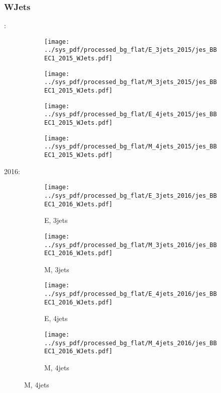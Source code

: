 \documentclass{beamer}
\begin{document}
\begin{frame}
\frametitle{WJets}
\fontsize{5}{1}:
\begin{figure}
\centering
\begin{subfigure}[b]{0.24\textwidth}
\texttt{[image: ../sys\_pdf/processed\_bg\_flat/E\_3jets\_2015/jes\_BBEC1\_2015\_WJets.pdf]}
\end{subfigure}
\begin{subfigure}[b]{0.24\textwidth}
\texttt{[image: ../sys\_pdf/processed\_bg\_flat/M\_3jets\_2015/jes\_BBEC1\_2015\_WJets.pdf]}
\end{subfigure}
\begin{subfigure}[b]{0.24\textwidth}
\texttt{[image: ../sys\_pdf/processed\_bg\_flat/E\_4jets\_2015/jes\_BBEC1\_2015\_WJets.pdf]}
\end{subfigure}
\begin{subfigure}[b]{0.24\textwidth}
\texttt{[image: ../sys\_pdf/processed\_bg\_flat/M\_4jets\_2015/jes\_BBEC1\_2015\_WJets.pdf]}
\end{subfigure}
\end{figure}
2016:
\begin{figure}
\centering
\begin{subfigure}[b]{0.24\textwidth}
\texttt{[image: ../sys\_pdf/processed\_bg\_flat/E\_3jets\_2016/jes\_BBEC1\_2016\_WJets.pdf]}
\captionsetup{font=tiny}
\caption{E, 3jets}
\end{subfigure}
\begin{subfigure}[b]{0.24\textwidth}
\texttt{[image: ../sys\_pdf/processed\_bg\_flat/M\_3jets\_2016/jes\_BBEC1\_2016\_WJets.pdf]}
\captionsetup{font=tiny}
\caption{M, 3jets}
\end{subfigure}
\begin{subfigure}[b]{0.24\textwidth}
\texttt{[image: ../sys\_pdf/processed\_bg\_flat/E\_4jets\_2016/jes\_BBEC1\_2016\_WJets.pdf]}
\captionsetup{font=tiny}
\caption{E, 4jets}
\end{subfigure}
\begin{subfigure}[b]{0.24\textwidth}
\texttt{[image: ../sys\_pdf/processed\_bg\_flat/M\_4jets\_2016/jes\_BBEC1\_2016\_WJets.pdf]}
\captionsetup{font=tiny}
\caption{M, 4jets}
\end{subfigure}
\end{figure}
\end{frame}
\end{document}
